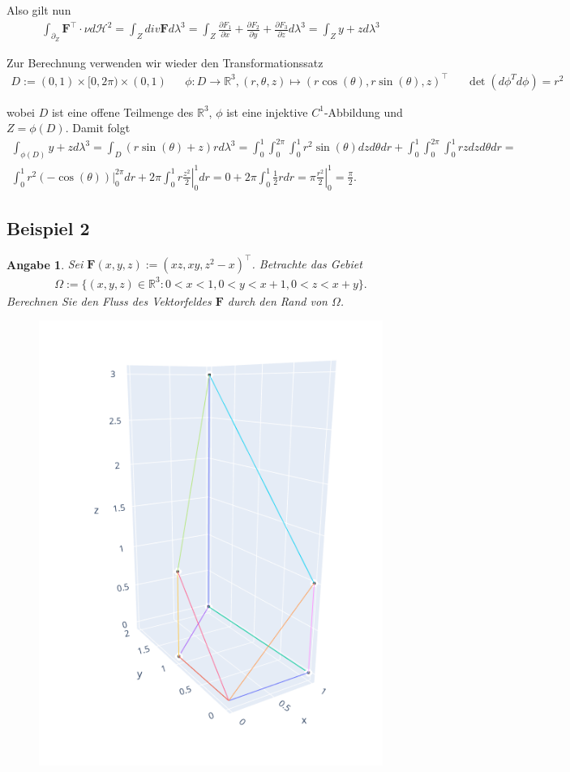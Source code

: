 \documentclass[]{article}
\newtheorem*{angabe*}{Angabe}
\begin{document}
\begin{enumerate}[label=(\roman*)]
	Also gilt nun
	\begin{align*}
		\int_{\partial_Z} \bm{F}^\top \cdot \nu d\mathcal{H}^2 = \int_Z div\bm{F} d\lambda^3 = \int_Z \frac{\partial F_1}{\partial x} + \frac{\partial F_2}{\partial y} + \frac{\partial F_3}{\partial z} d\lambda^3 = \int_Z y + z d\lambda^3
	\end{align*}

	Zur Berechnung verwenden wir wieder den Transformationssatz
	\begin{align*}
		D := (0,1)\times[0,2\pi)\times(0,1) && \phi:D\rightarrow\mathbb{R}^3, (r,\theta,z) \mapsto (r\cos(\theta), r\sin(\theta), z)^\top && \det(d\phi^T d\phi) = r^2
	\end{align*}

	wobei $D$ ist eine offene Teilmenge des $\mathbb{R}^3$, $\phi$ ist eine injektive $C^1$-Abbildung und $Z=\phi(D)$. Damit folgt 
	\begin{align*}
		\int_{\phi(D)} y + z d\lambda^3 = \int_D (r\sin(\theta) + z)r d\lambda^3 = \int_{0}^{1} \int_{0}^{2\pi} \int_{0}^{1} r^2 \sin(\theta) dz d\theta dr + \int_{0}^{1} \int_{0}^{2\pi} \int_{0}^{1} rz dz d\theta dr = \\
		\int_{0}^{1} r^2 \left.(-\cos(\theta))\right\vert_0^{2\pi} dr + 2\pi \int_{0}^{1} r \left. \frac{z^2}{2}\right\vert_0^1 dr = 0 + 2\pi \int_0^1 \frac{1}{2} r dr = \pi \left. \frac{r^2}{2}\right\vert_0^1 = \frac{\pi}{2}.
	\end{align*}

\end{enumerate}
\newpage

\subsection*{Beispiel 2}
\begin{angabe*}
	Sei $\bm{F}(x,y,z):=(xz, xy, z^2-x)^\top$. Betrachte das Gebiet
	\begin{align*}
		\Omega := \{(x,y,z)\in \mathbb{R}^3: 0<x<1, 0<y<x+1, 0<z<x+y\}.
	\end{align*}
	Berechnen Sie den Fluss des Vektorfeldes $\bm{F}$ durch den Rand von $\Omega$.
\end{angabe*}

\begin{figure}[h!]
	\includegraphics[width=0.5\columnwidth]{bsp_2.png}
\end{figure}
\end{document}
